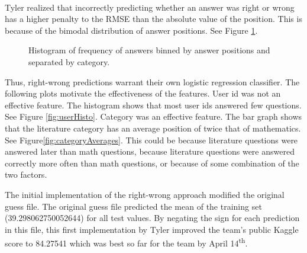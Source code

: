 \documentclass[letterpaper]{article}
\begin{document}
\paragraph{} Tyler realized that incorrectly predicting whether an answer was right or wrong has a higher penalty to the RMSE than the absolute value of the position. This is because of the bimodal distribution of answer positions. See Figure \ref{fig:categoryPositions}.


\begin{figure}[H]
	\begin{center}
	\end{center}
	\caption{Histogram of frequency of answers binned by answer positions and separated by category.}
	\label{fig:categoryPositions}
\end{figure}

Thus, right-wrong predictions warrant their own logistic regression classifier. The following plots motivate the effectiveness of the features. User id was not an effective feature. The histogram shows that most user ids answered few questions. See Figure \ref{fig:userHisto}. Category was an effective feature. The bar graph shows that the literature category has an average position of twice that of mathematics. See Figure\ref{fig:categoryAverages}. This could be because literature questions were answered later than math questions, because literature questions were answered correctly more often than math questions, or because of some combination of the two factors. 

The initial implementation of the right-wrong approach modified the original guess file. The original guess file predicted the mean of the training set (39.298062750052644) for all test values. By negating the sign for each prediction in this file, this first implementation by Tyler improved the team's public Kaggle score to 84.27541 which was best so far for the team by April 14\textsuperscript{th}.
\end{document}
